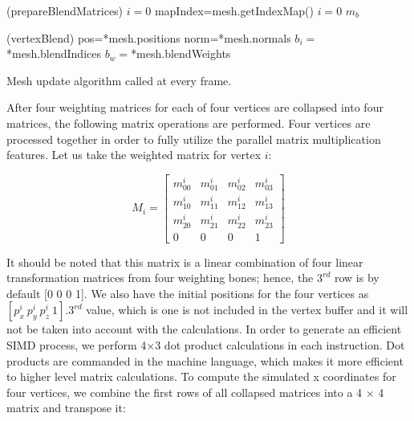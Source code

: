 \begin{algorithm}[ht]
\DontPrintSemicolon %
\function(prepareBlendMatrices){
$i=0$\;
\;
mapIndex=mesh.getIndexMap() 
$i=0$\;
\;
\Return $m_b$\;
}

\function(vertexBlend){
pos=*mesh.positions\;
norm=*mesh.normals\;
$b_i=$*mesh.blendIndices\;
$b_w=$*mesh.blendWeights\;
}
\caption{Mesh update algorithm called at every frame.}
\label{algo:updateMesh}
\end{algorithm}

After four weighting matrices for each of four vertices are collapsed into four matrices, the following matrix operations are performed. Four vertices are processed together in order to fully utilize the parallel matrix multiplication features. Let us take the weighted matrix for vertex $i$:

\begin{equation}
M_i=
\begin{bmatrix}
m_{00}^i & m_{01}^i & m_{02}^i & m_{03}^i \\
m_{10}^i & m_{11}^i & m_{12}^i & m_{13}^i \\
m_{20}^i & m_{21}^i & m_{22}^i & m_{23}^i \\
0 & 0 & 0 & 1
\end{bmatrix}
\label{eqn:weighted_matrix_for_i}
\end{equation}

It should be noted that this matrix is a linear combination of four linear transformation matrices from four weighting bones; hence, the $3^{rd}$ row is by default [0 0 0 1]. We also have the initial positions for the four vertices as $[p^i_x \: p^i_y  \: p^i_z  \: 1]$.$3^{rd}$ value, which is one is not included in the vertex buffer and it will not be taken into account with the calculations. In order to generate an efficient SIMD process, we perform 4$\times$3 dot product calculations in each instruction. Dot products are commanded in the machine language, which makes it more efficient to higher level matrix calculations. To compute the simulated x coordinates for  four vertices, we combine the first rows of all collapsed matrices into a 4 $\times$ 4 matrix and transpose it:

